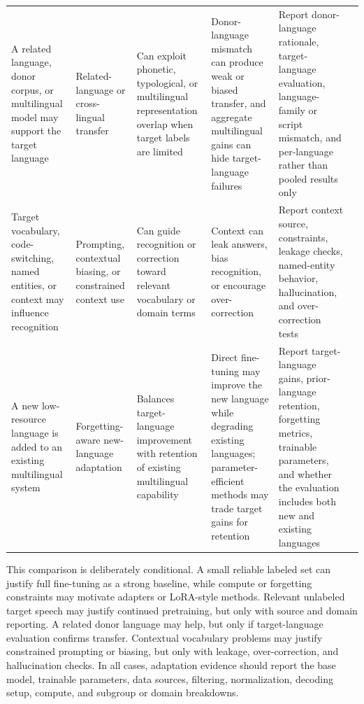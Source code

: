\documentclass[pdflatex,sn-basic,iicol]{sn-jnl}
\theoremstyle{thmstyleone}
\theoremstyle{thmstyletwo}
\theoremstyle{thmstylethree}
\begin{document}
\begin{table}[htbp]
\begin{tabularx}{\textwidth}{YYYYYY}
A related language, donor corpus, or multilingual model may support the target language & Related-language or cross-lingual transfer & Can exploit phonetic, typological, or multilingual representation overlap when target labels are limited & Donor-language mismatch can produce weak or biased transfer, and aggregate multilingual gains can hide target-language failures & Report donor-language rationale, target-language evaluation, language-family or script mismatch, and per-language rather than pooled results only & \citep{conneau21_interspeech,feng23_interspeech} \\
Target vocabulary, code-switching, named entities, or context may influence recognition & Prompting, contextual biasing, or constrained context use & Can guide recognition or correction toward relevant vocabulary or domain terms & Context can leak answers, bias recognition, or encourage over-correction & Report context source, constraints, leakage checks, named-entity behavior, hallucination, and over-correction tests & \citep{ma2024asrerrorcorrection,wang2025contextasrbench} \\
A new low-resource language is added to an existing multilingual system & Forgetting-aware new-language adaptation & Balances target-language improvement with retention of existing multilingual capability & Direct fine-tuning may improve the new language while degrading existing languages; parameter-efficient methods may trade target gains for retention & Report target-language gains, prior-language retention, forgetting metrics, trainable parameters, and whether the evaluation includes both new and existing languages & \citep{qian24_interspeech} \\
\bottomrule
\end{tabularx}
\end{table}

This comparison is deliberately conditional. A small reliable labeled set can justify full fine-tuning as a strong baseline, while compute or forgetting constraints may motivate adapters or LoRA-style methods. Relevant unlabeled target speech may justify continued pretraining, but only with source and domain reporting. A related donor language may help, but only if target-language evaluation confirms transfer. Contextual vocabulary problems may justify constrained prompting or biasing, but only with leakage, over-correction, and hallucination checks. In all cases, adaptation evidence should report the base model, trainable parameters, data sources, filtering, normalization, decoding setup, compute, and subgroup or domain breakdowns.
\end{document}

